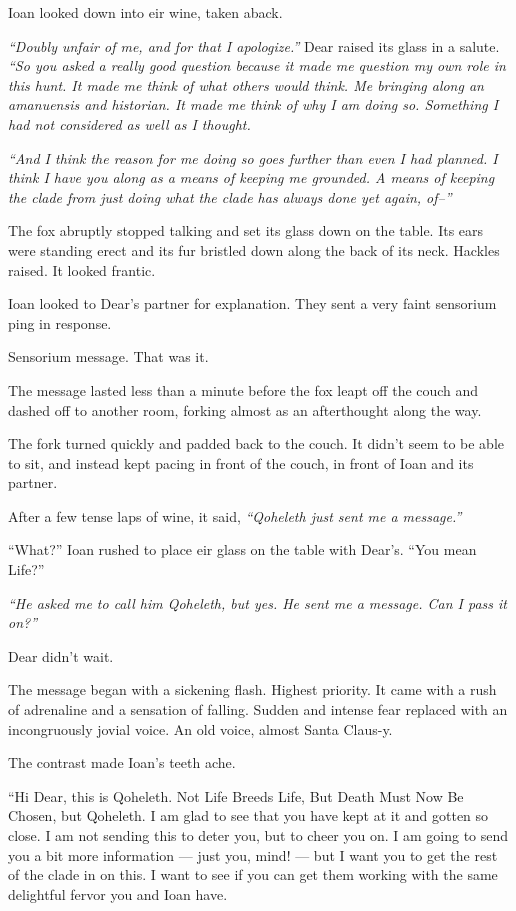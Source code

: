 Ioan looked down into eir wine, taken aback.

\emph{``Doubly unfair of me, and for that I apologize.''} Dear raised its glass in a salute. \emph{``So you asked a really good question because it made me question my own role in this hunt. It made me think of what others would think. Me bringing along an amanuensis and historian. It made me think of why I am doing so. Something I had not considered as well as I thought.}

\emph{``And I think the reason for me doing so goes further than even I had planned. I think I have you along as a means of keeping me grounded. A means of keeping the clade from just doing what the clade has always done yet again, of--''}

The fox abruptly stopped talking and set its glass down on the table. Its ears were standing erect and its fur bristled down along the back of its neck. Hackles raised. It looked frantic.

Ioan looked to Dear's partner for explanation. They sent a very faint sensorium ping in response.

Sensorium message. That was it.

The message lasted less than a minute before the fox leapt off the couch and dashed off to another room, forking almost as an afterthought along the way.

The fork turned quickly and padded back to the couch. It didn't seem to be able to sit, and instead kept pacing in front of the couch, in front of Ioan and its partner.

After a few tense laps of wine, it said, \emph{``Qoheleth just sent me a message.''}

``What?'' Ioan rushed to place eir glass on the table with Dear's. ``You mean Life?''

\emph{``He asked me to call him Qoheleth, but yes. He sent me a message. Can I pass it on?''}

Dear didn't wait.

The message began with a sickening flash. Highest priority. It came with a rush of adrenaline and a sensation of falling. Sudden and intense fear replaced with an incongruously jovial voice. An old voice, almost Santa Claus-y.

The contrast made Ioan's teeth ache.

``Hi Dear, this is Qoheleth. Not Life Breeds Life, But Death Must Now Be Chosen, but Qoheleth. I am glad to see that you have kept at it and gotten so close. I am not sending this to deter you, but to cheer you on. I am going to send you a bit more information — just you, mind! — but I want you to get the rest of the clade in on this. I want to see if you can get them working with the same delightful fervor you and Ioan have.

